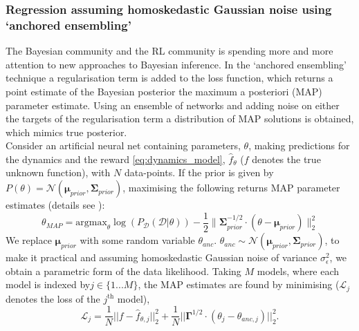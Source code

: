 \documentclass[
reprint,nofootinbib,
amsmath,amssymb,amsfonts,clevref,
aps,
prstab,
]{revtex4-2}
\begin{document}
	\subsubsection{Regression assuming homoskedastic Gaussian noise using `anchored ensembling'}
	The Bayesian community and the RL community is spending more and more attention to
	new approaches to Bayesian inference. In the `anchored ensembling' technique a regularisation
	term is added to the loss function, which returns a point estimate of
	the Bayesian posterior the maximum a posteriori (MAP) parameter estimate. 
	Using an ensemble of networks and adding noise on either the targets of the regularisation term a distribution of MAP solutions  \cite{Gu2007, Chen2011, Bardsley2012, Pearce2018} is obtained, which mimics true posterior.\\
	Consider an artificial neural net containing parameters, ${\theta}$, making predictions for the dynamics and the reward \cref{eq:dynamics_model}, $\hat{f}_\theta$ ($f$ denotes the true unknown function), with $N$ data-points. If the prior is given by $P(\theta) = \mathcal{N}(\pmb{\mu}_{prior}, \pmb{\Sigma}_{prior})$, maximising the following returns MAP parameter estimates (details see \cite{Pearce2018}):
	\begin{equation}
		\label{eq_MAP_loglike_anc}
		{\theta}_{MAP}  = \text{argmax}_{{\theta}} \log( P_{\mathcal{D}}( \mathcal{D} | {\theta} ) ) - 
		\frac{1}{2} 
		\lVert \pmb{\Sigma}_{prior}^{-1/2} \cdot
		({\theta} - \pmb{\mu}_{prior}) \rVert^2_2
	\end{equation}
	We replace $\pmb{\mu}_{prior}$ with some random variable $ {\theta}_{anc}$.
	${\theta}_{anc} \sim \mathcal{N}(\pmb{\mu}_{prior},\pmb{\Sigma}_{prior} )$, to make it practical and
	assuming homoskedastic Gaussian noise of variance $\sigma^2_\epsilon$, we obtain a parametric form of the data likelihood. Taking $M$ models, where each model is indexed by$j \in \{1 ... M\}$, the MAP estimates are found by minimising ($\mathcal L_{j}$ denotes the loss of the $j^\text{th}$ model),
	\begin{equation}
		\label{eqn_anch_loss_matrix}
		\mathcal L_{j} =  
		\frac{1}{N} \lvert \lvert f - \hat{f}_{\theta, j} \rvert \rvert ^2_2
		+ \frac{1}{N} \lvert \lvert \pmb{\Gamma}^{1/2} \cdot (\theta_j - \theta_{anc,j}) \rvert \rvert ^2_2.
	\end{equation}
\end{document}
